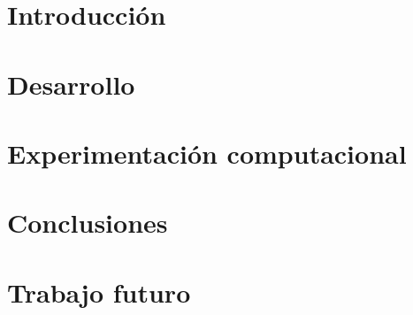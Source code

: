 \documentclass[11pt,a4paper]{tesis}
\begin{document}
\def\titulo{Licenciado }
\def\autor{Amit Stein, Juan Andrés Knebel}
\def\tituloTesis{Nuevos algoritmos para recuperación de ``ítems empaquetados'': \mbox{Algo}}
\def\runtitulo{Nuevos algoritmos para recuperación de ``ítems empaquetados''}
\def\runtitle{New Algorithms for composite retrival}
\def\director{Obi-Wan Kenobi}
\def\codirector{Master Yoda}
\def\lugar{Buenos Aires, 2014}
%

\frontmatter
\pagestyle{empty}


\cleardoublepage
%



\cleardoublepage
\tableofcontents

\mainmatter
\pagestyle{headings}


\chapter{Introducción}
\label{chap:introduccion}

\chapter{Desarrollo}
\label{chap:desarrollo}

\chapter{Experimentación computacional}
\label{chap:experimentacion}

\chapter{Conclusiones}
\label{chap:conclusiones}

%
\chapter{Trabajo futuro}
\label{chap:trabajos-futuros}

%


\backmatter

 
\end{document}
